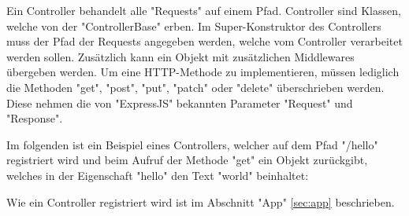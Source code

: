 \label{sec:controller}

Ein Controller behandelt alle "Requests" auf einem Pfad. 
Controller sind Klassen, welche von der "ControllerBase" erben. Im Super-Konstruktor des Controllers muss der Pfad der Requests angegeben werden, welche vom Controller verarbeitet werden sollen. Zusätzlich kann ein Objekt mit zusätzlichen Middlewares übergeben werden. Um eine HTTP-Methode zu implementieren, müssen lediglich die Methoden "get", "post", "put", "patch" oder "delete" überschrieben werden. Diese nehmen die von "ExpressJS" bekannten Parameter "Request" und "Response". 

Im folgenden ist ein Beispiel eines Controllers, welcher auf dem Pfad "/hello" registriert wird und beim Aufruf der Methode "get" ein Objekt zurückgibt, welches in der Eigenschaft "hello" den Text "world" beinhaltet:


Wie ein Controller registriert wird ist im Abschnitt "App" \ref{sec:app} beschrieben. 